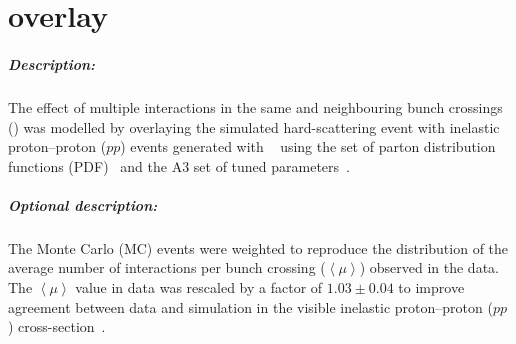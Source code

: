 \chapter{\Pileup overlay}

\paragraph{Description:}

The effect of multiple interactions in the same and neighbouring bunch
crossings (\pileup) was modelled by overlaying the simulated hard-scattering event with
inelastic proton--proton (\(pp\)) events generated with \PYTHIA[8.186]~\cite{Sjostrand:2007gs}
using the \NNPDF[2.3lo] set of parton distribution functions (PDF)~\cite{Ball:2012cx} and the
A3 set of tuned parameters~\cite{ATL-PHYS-PUB-2016-017}.

\paragraph{Optional description:}

The Monte Carlo (MC) events were weighted to reproduce the
distribution of the average number of interactions per bunch crossing
(\(\left<\mu \right>\)) observed in the data. The \(\left<\mu \right>\)
value in data was rescaled by a factor of \(1.03\pm 0.04\) to improve
agreement between data and simulation in the visible inelastic
proton--proton (\(pp\)) cross-section~\cite{STDM-2015-05}.

